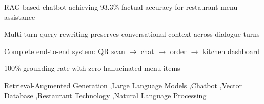 \documentclass[a4paper,fleqn]{cas-dc}
\begin{document}
\begin{highlights}
\item RAG-based chatbot achieving 93.3\% factual accuracy for restaurant menu assistance
\item Multi-turn query rewriting preserves conversational context across dialogue turns
\item Complete end-to-end system: QR scan $\rightarrow$ chat $\rightarrow$ order $\rightarrow$ kitchen dashboard
\item 100\% grounding rate with zero hallucinated menu items
\end{highlights}

\begin{keywords}
Retrieval-Augmented Generation \sep Large Language Models \sep Chatbot \sep Vector Database \sep Restaurant Technology \sep Natural Language Processing
\end{keywords}

\maketitle





\printcredits



\end{document}

